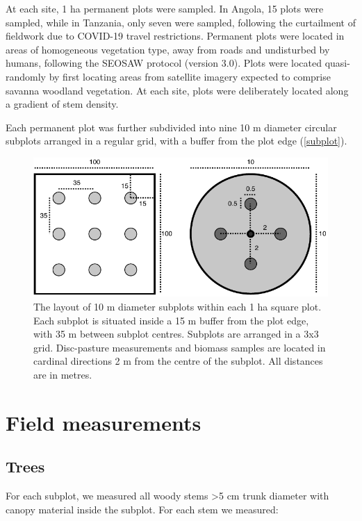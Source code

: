 \documentclass[11pt,a4paper]{article}
\begin{document}


At each site, 1 ha permanent plots were sampled. In Angola, 15 plots were sampled, while in Tanzania, only seven were sampled, following the curtailment of fieldwork due to COVID-19 travel restrictions. Permanent plots were located in areas of homogeneous vegetation type, away from roads and undisturbed by humans, following the SEOSAW protocol (version 3.0). Plots were located quasi-randomly by first locating areas from satellite imagery expected to comprise savanna woodland vegetation. At each site, plots were deliberately located along a gradient of stem density.

Each permanent plot was further subdivided into nine 10 m diameter circular subplots arranged in a regular grid, with a buffer from the plot edge (\autoref{subplot}).

\begin{figure}[H]
\centering
	\includegraphics[width=\textwidth]{subplot}
	\caption{The layout of 10 m diameter subplots within each 1 ha square plot. Each subplot is situated inside a 15 m buffer from the plot edge, with 35 m between subplot centres. Subplots are arranged in a 3x3 grid. Disc-pasture measurements and biomass samples are located in cardinal directions 2 m from the centre of the subplot. All distances are in metres.}
	\label{subplot}
\end{figure}

\section{Field measurements}

\subsection{Trees}

For each subplot, we measured all woody stems >5 cm trunk diameter with canopy material inside the subplot. For each stem we measured:
\end{document}
